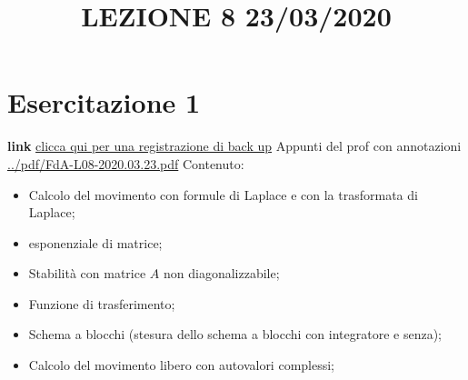 \section{Esercitazione 1}
\title{LEZIONE 8 23/03/2020}\newline
\textbf{link} \href{https://onedrive.live.com/?authkey=%21AATVJK3srNwxGzs&id=EE092FF4FF7B5B0E%212158&cid=EE092FF4FF7B5B0E}{clicca qui per una registrazione di back up}\newline
\newline
Appunti del prof con annotazioni \url{../pdf/FdA-L08-2020.03.23.pdf}\newline
Contenuto:
\begin{itemize}
    \item Calcolo del movimento con formule di Laplace e con la trasformata di Laplace;
    \item esponenziale di matrice;
    \item Stabilità con matrice $A$ non diagonalizzabile;
    \item Funzione di trasferimento;
    \item Schema a blocchi (stesura dello schema a blocchi con integratore e senza);
    \item Calcolo del movimento libero con autovalori complessi;
\end{itemize}
